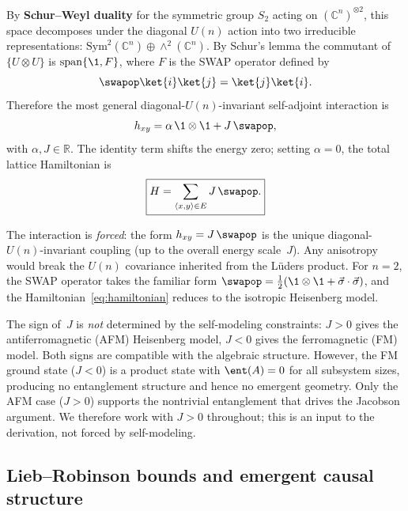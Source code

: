 By \textbf{Schur--Weyl duality} for the symmetric group $S_2$ acting
on $(\mathbb{C}^n)^{\otimes 2}$, this space decomposes under the
diagonal $U(n)$ action into two irreducible representations:
$\mathrm{Sym}^2(\mathbb{C}^n) \oplus \wedge^2(\mathbb{C}^n)$.  By
Schur's lemma the commutant of $\{U \otimes U\}$ is
$\mathrm{span}\{\1, F\}$, where $F$ is the SWAP operator defined by
\begin{equation}
  \swapop \ket{i}\ket{j} = \ket{j}\ket{i}.
  \label{eq:swap-def}
\end{equation}
Therefore the most general diagonal-$U(n)$-invariant self-adjoint
interaction is
\begin{equation}
  h_{xy} = \alpha\, \1 \otimes \1 + J\, \swapop,
  \label{eq:h-general}
\end{equation}
with $\alpha, J \in \mathbb{R}$.  The identity term shifts the energy
zero; setting $\alpha = 0$, the total lattice Hamiltonian is
\begin{equation}
  \boxed{H = \sum_{\langle x,y \rangle \in E} J\, \swapop.}
  \label{eq:hamiltonian}
\end{equation}

The interaction is \emph{forced}: the form $h_{xy} = J\,\swapop$ is
the unique diagonal-$U(n)$-invariant coupling (up to the overall
energy scale~$J$).  Any anisotropy would break the $U(n)$ covariance
inherited from the L\"uders product.  For $n = 2$, the SWAP operator
takes the familiar form
$\swapop = \frac{1}{2}(\1 \otimes \1 + \vec{\sigma} \cdot \vec{\sigma})$,
and the Hamiltonian~\eqref{eq:hamiltonian} reduces to the isotropic
Heisenberg model.

The sign of~$J$ is \emph{not} determined by the self-modeling
constraints: $J > 0$ gives the antiferromagnetic (AFM) Heisenberg
model, $J < 0$ gives the ferromagnetic (FM) model.  Both signs are
compatible with the algebraic structure.  However, the FM ground state
($J < 0$) is a product state with $\ent(A) = 0$ for all subsystem
sizes, producing no entanglement structure and hence no emergent
geometry.  Only the AFM case ($J > 0$) supports the nontrivial
entanglement that drives the Jacobson argument.  We therefore work
with $J > 0$ throughout; this is an input to the derivation, not
forced by self-modeling.

\subsection{Lieb--Robinson bounds and emergent causal structure}
\label{sec:lr-bounds}


